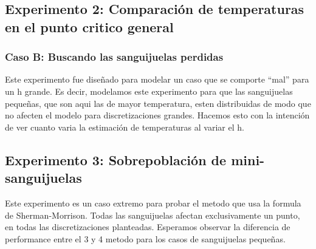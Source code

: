 \subsection{Experimento 2: Comparaci\'on de temperaturas en el punto critico general}

\subsubsection{Caso B: Buscando las sanguijuelas perdidas}

Este experimento fue dise\~nado para modelar un caso que se comporte ``mal'' para un h grande. Es decir, modelamos este experimento para que 
las sanguijuelas peque\~nas, que son aqui las de mayor temperatura, esten distribuidas de modo que no afecten el modelo para discretizaciones grandes. 
Hacemos esto con la intenci\'on de ver cuanto varia la estimaci\'on de temperaturas al variar el h.


\subsection{Experimento 3: Sobrepoblaci\'on de mini-sanguijuelas}

Este experimento es un caso extremo para probar el metodo que usa la formula de Sherman-Morrison. Todas las sanguijuelas afectan exclusivamente un punto,
en todas las discretizaciones planteadas. Esperamos observar la diferencia de performance entre el 3 y 4 metodo para los casos de sanguijuelas peque\~nas.



